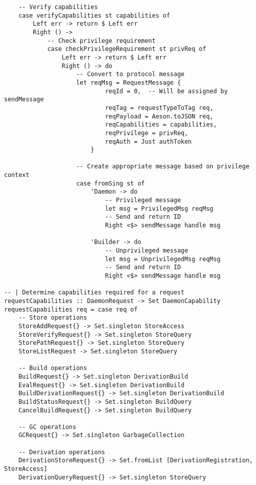 \documentclass{article}
\begin{document}
\begin{tcolorbox}[title=Ten/Daemon/Protocol.hs Changes]
\begin{verbatim}
    -- Verify capabilities
    case verifyCapabilities st capabilities of
        Left err -> return $ Left err
        Right () ->
            -- Check privilege requirement
            case checkPrivilegeRequirement st privReq of
                Left err -> return $ Left err
                Right () -> do
                    -- Convert to protocol message
                    let reqMsg = RequestMessage {
                            reqId = 0,  -- Will be assigned by sendMessage
                            reqTag = requestTypeToTag req,
                            reqPayload = Aeson.toJSON req,
                            reqCapabilities = capabilities,
                            reqPrivilege = privReq,
                            reqAuth = Just authToken
                        }

                    -- Create appropriate message based on privilege context
                    case fromSing st of
                        'Daemon -> do
                            -- Privileged message
                            let msg = PrivilegedMsg reqMsg
                            -- Send and return ID
                            Right <$> sendMessage handle msg

                        'Builder -> do
                            -- Unprivileged message
                            let msg = UnprivilegedMsg reqMsg
                            -- Send and return ID
                            Right <$> sendMessage handle msg

-- | Determine capabilities required for a request
requestCapabilities :: DaemonRequest -> Set DaemonCapability
requestCapabilities req = case req of
    -- Store operations
    StoreAddRequest{} -> Set.singleton StoreAccess
    StoreVerifyRequest{} -> Set.singleton StoreQuery
    StorePathRequest{} -> Set.singleton StoreQuery
    StoreListRequest -> Set.singleton StoreQuery

    -- Build operations
    BuildRequest{} -> Set.singleton DerivationBuild
    EvalRequest{} -> Set.singleton DerivationBuild
    BuildDerivationRequest{} -> Set.singleton DerivationBuild
    BuildStatusRequest{} -> Set.singleton BuildQuery
    CancelBuildRequest{} -> Set.singleton BuildQuery

    -- GC operations
    GCRequest{} -> Set.singleton GarbageCollection

    -- Derivation operations
    DerivationStoreRequest{} -> Set.fromList [DerivationRegistration, StoreAccess]
    DerivationQueryRequest{} -> Set.singleton StoreQuery


\end{verbatim}
\end{tcolorbox}
\end{document}
